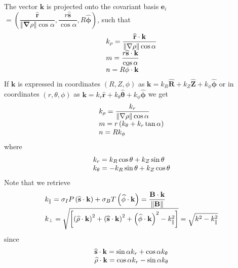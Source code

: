 \documentclass[a4paper,12pt]{article}%
\begin{document}
The vector $\mathbf{k}$ is projected onto the covariant basis $\mathbf{e}_{i}$
$=\left(  \dfrac{\widehat{\mathbf{r}}}{\left\Vert \mathbf{\nabla}%
\rho\right\Vert \cos\alpha},\dfrac{r\widehat{\mathbf{s}}}{\cos\alpha
},R\widehat{\mathbf{\phi}}\right)  $, such that
\begin{equation}%
\begin{array}
[c]{l}%
k_{\rho}=\dfrac{\widehat{\mathbf{r}}\cdot\mathbf{k}}{\left\Vert \mathbf{\nabla
}\rho\right\Vert \cos\alpha}\\
m=\dfrac{r\widehat{\mathbf{s}}\cdot\mathbf{k}}{\cos\alpha}\\
n=R\widehat{\mathbf{\phi}}\cdot\mathbf{k}%
\end{array}
\end{equation}
If $\mathbf{k}$ is expressed in coordinates $\left(  R,Z,\phi\right)  $ as
$\mathbf{k}=k_{R}\widehat{\mathbf{R}}+k_{Z}\widehat{\mathbf{Z}}+k_{\phi
}\widehat{\mathbf{\phi}}$ or in coordinates $\left(  r,\theta,\phi\right)  $
as $\mathbf{k}=k_{r}\widehat{\mathbf{r}}+k_{\theta}\widehat{\mathbf{\theta}%
}+k_{\phi}\widehat{\mathbf{\phi}}$ we get%
\begin{equation}%
\begin{array}
[c]{l}%
k_{\rho}=\dfrac{k_{r}}{\left\Vert \mathbf{\nabla}\rho\right\Vert \cos\alpha}\\
m=r\left(  k_{\theta}+k_{r}\tan\alpha\right) \\
n=Rk_{\phi}%
\end{array}
\end{equation}
where%
\begin{equation}%
\begin{array}
[c]{l}%
k_{r}=k_{R}\cos\theta+k_{Z}\sin\theta\\
k_{\theta}=-k_{R}\sin\theta+k_{Z}\cos\theta
\end{array}
\end{equation}
Note that we retrieve%
\begin{equation}%
\begin{array}
[c]{l}%
k_{\Vert}=\sigma_{I}P\left(  \widehat{\mathbf{s}}\cdot\mathbf{k}\right)
+\sigma_{B}T\left(  \widehat{\mathbf{\phi}}\cdot\mathbf{k}\right)
=\dfrac{\mathbf{B}\cdot\mathbf{k}}{\left\Vert \mathbf{B}\right\Vert }\\
k_{\bot}=\sqrt{\left[  \left(  \widehat{\mathbf{\rho}}\cdot\mathbf{k}\right)
^{2}+\left(  \widehat{\mathbf{s}}\cdot\mathbf{k}\right)  ^{2}+\left(
\widehat{\mathbf{\phi}}\cdot\mathbf{k}\right)  ^{2}-k_{\Vert}^{2}\right]
}=\sqrt{k^{2}-k_{\Vert}^{2}}%
\end{array}
\end{equation}
since%
\begin{equation}%
\begin{array}
[c]{l}%
\widehat{\mathbf{s}}\cdot\mathbf{k}=\sin\alpha k_{r}+\cos\alpha k_{\theta}\\
\widehat{\mathbf{\rho}}\cdot\mathbf{k}=\cos\alpha k_{r}-\sin\alpha k_{\theta}%
\end{array}
\end{equation}
\end{document}
